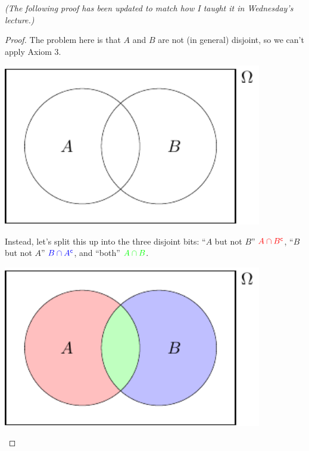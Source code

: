 \documentclass[
  a4paper,
]{book}
\theoremstyle{definition}
\theoremstyle{definition}
\theoremstyle{definition}
\theoremstyle{definition}
\theoremstyle{remark}
\begin{document}
\emph{(The following proof has been updated to match how I taught it in Wednesday's lecture.)}

\begin{proof}
The problem here is that \(A\) and \(B\) are not (in general) disjoint, so we can't apply Axiom 3.

\begin{center}\includegraphics[width=320pt]{math1710_files/figure-latex/add3-1} \end{center}

Instead, let's split this up into the three disjoint bits: {``\(A\) but not \(B\)''} \(\color{red}{A \cap B^\mathsf{c}}\), {``\(B\) but not \(A\)''} \(\color{blue}{B \cap A^\mathsf{c}}\), and {``both''} \(\color{green}{A \cap B}\).

\begin{center}\includegraphics[width=320pt]{math1710_files/figure-latex/add4-1} \end{center}


\end{proof}
\end{document}
